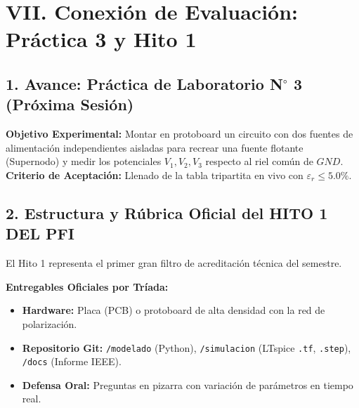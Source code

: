 \documentclass[11pt, a4paper]{article}
\begin{document}
\newpage
\section{VII. Conexión de Evaluación: Práctica 3 y Hito 1}

\subsection*{1. Avance: Práctica de Laboratorio N$^\circ$ 3 (Próxima Sesión)}
\textbf{Objetivo Experimental:} Montar en protoboard un circuito con dos fuentes de alimentación independientes aisladas para recrear una fuente flotante (Supernodo) y medir los potenciales $V_1, V_2, V_3$ respecto al riel común de $GND$. \\
\textbf{Criterio de Aceptación:} Llenado de la tabla tripartita en vivo con $\varepsilon_r \le 5.0\%$.

\subsection*{2. Estructura y Rúbrica Oficial del HITO 1 DEL PFI}
El Hito 1 representa el primer gran filtro de acreditación técnica del semestre.

\vspace{0.2cm}
\textbf{Entregables Oficiales por Tríada:}
\begin{itemize}[itemsep=1pt]
    \item \textbf{Hardware:} Placa (PCB) o protoboard de alta densidad con la red de polarización.
    \item \textbf{Repositorio Git:} \texttt{/modelado} (Python), \texttt{/simulacion} (LTspice \texttt{.tf}, \texttt{.step}), \texttt{/docs} (Informe IEEE).
    \item \textbf{Defensa Oral:} Preguntas en pizarra con variación de parámetros en tiempo real.
\end{itemize}
\end{document}
